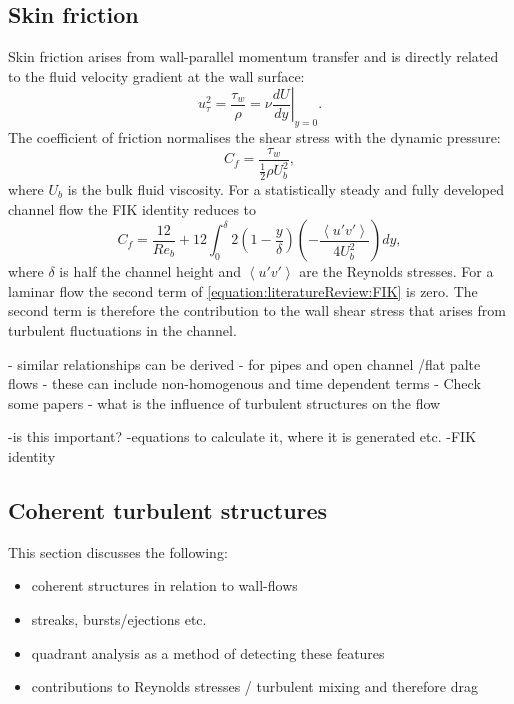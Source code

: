 \documentclass[12pt,oneside,a4paper]{article}
\begin{document}
\subsection{Skin friction}
Skin friction arises from wall-parallel momentum transfer and is directly related to the fluid velocity gradient at the wall surface:
\begin{equation}
\label{equation:literatureReview:wallShearStress}
u_\tau^2 = \frac{\tau_w}{\rho} = \left. \nu \frac{d U}{d y} \right\vert_{y=0}.
\end{equation}
The coefficient of friction normalises the shear stress with the dynamic pressure:
\begin{equation}
C_f = \frac{\tau_w}{\frac{1}{2} \rho U_b^2},
\end{equation}
where $U_b$ is the bulk fluid viscosity. For a statistically steady and fully developed channel flow the FIK identity \citep{fukagata2002} reduces to
\begin{equation}
\label{equation:literatureReview:FIK}
C_f = \frac{12}{Re_b} + 12 \int_0^\delta 2 \left(1 - \frac{y}{\delta} \right)\left( - \frac{\left< u'v' \right> }{4 U_b^2} \right) dy,
\end{equation}
where $\delta$ is half the channel height and $\left< u'v' \right>$ are the Reynolds stresses. For a laminar flow the second term of \eqref{equation:literatureReview:FIK} is zero. The second term is therefore the contribution to the wall shear stress that arises from turbulent fluctuations in the channel. 

- similar relationships can be derived 
- for pipes and open channel /flat palte flows
- these can include non-homogenous and time dependent terms
- Check some papers - what is the influence of turbulent structures on the flow




-is this important?
-equations to calculate it, where it is generated etc.
-FIK identity


\subsection{Coherent turbulent structures}
This section discusses the following:
\begin{itemize}
\item coherent structures in relation to wall-flows
\item streaks, bursts/ejections etc.
\item quadrant analysis as a method of detecting these features
\item contributions to Reynolds stresses / turbulent mixing and therefore drag

\end{itemize}
\end{document}
